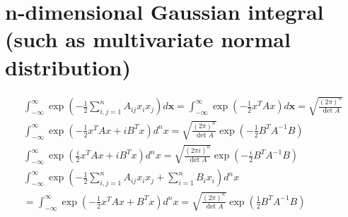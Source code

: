 \section*{n-dimensional Gaussian integral (such as multivariate normal distribution)}
\begin{center}
    \begin{equation*}
        \begin{gathered}
        \int_{-\infty}^{\infty} \exp \left(-\frac{1}{2} \sum_{i, j=1}^{n} A_{i j} x_{i} x_{j}\right) d \mathbf{x}=\int_{-\infty}^{\infty} \exp \left(-\frac{1}{2} x^{T} A x\right) d \mathbf{x}=\sqrt{\frac{(2 \pi)^{n}}{\operatorname{det} A}} \\
        \int_{-\infty}^{\infty} \exp \left(-\frac{1}{2} x^{T} A x+i B^{T} x\right) d^{n} x=\sqrt{\frac{(2 \pi)^{n}}{\operatorname{det} A}} \exp \left(-\frac{1}{2} B^{T} A^{-1} B\right) \\
        \int_{-\infty}^{\infty} \exp \left(\frac{i}{2} x^{T} A x+i B^{T} x\right) d^{n} x=\sqrt{\frac{(2 \pi i)^{n}}{\operatorname{det} A}} \exp \left(-\frac{i}{2} B^{T} A^{-1} B\right) \\
        \int_{-\infty}^{\infty} \exp \left(-\frac{1}{2} \sum_{i, j=1}^{n} A_{i j} x_{i} x_{j}+\sum_{i=1}^{n} B_{i} x_{i}\right) d^{n}x\\
        =\int_{-\infty}^{\infty} \exp \left(-\frac{1}{2} x^{T} A x+B^{T} x\right) d^{n} x=\sqrt{\frac{(2 \pi)^{n}}{\operatorname{det} A}} \exp \left(\frac{1}{2} B^{T} A^{-1} B\right) \\
        \end{gathered}
    \end{equation*}
\end{center}
